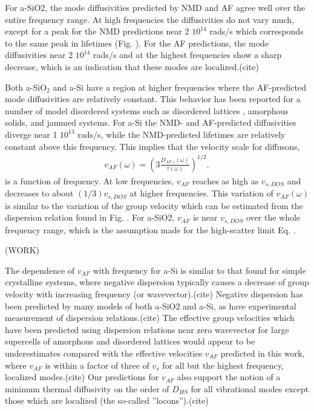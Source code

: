 \documentclass[aps,prb,onecolumn,preprint,superscriptaddress,footinbib,amsmath,amssymb,floatfix]{revtex4}
\begin{document}
For a-SiO2, the mode diffusivities predicted by NMD and AF agree 
well over the entire frequency range. At high frequencies the 
diffusivities do not vary much, except for a 
peak for the NMD predictions near 2 $10^{14}$ rads/s which 
corresponds to the same peak in lifetimes (Fig. ). For 
the AF predictions, the mode diffusivities near 
2 $10^{14}$ rads/s and at the highest frequencies 
show a sharp decrease, which is an indication 
that these modes are localized.(cite) 

Both a-SiO$_2$ and a-Si have a region at higher frequencies where the 
AF-predicted mode diffusivities are relatively constant. This behavior 
has been reported for a number of model disordered systems such as 
disordered lattices
\cite{sheng_heat_1991,beltukov_ioffe-regel_2013,larkin_predicting_2013}, 
amorphous solids,\cite{he_thermal_2011} 
and jammed systems.\cite{xu_energy_2009,vitelli_heat_2010}  
For a-Si the NMD- and AF-predicted diffusivities diverge 
near 1 $10^{13}$ rads$/$s, while the NMD-predicted lifetimes 
are relatively constant above this frequency.  This implies 
that the velocity scale for diffusons,
\begin{equation}\label{EQ:vAF}
\begin{split}
v_{AF}(\omega) = \left(3\frac{D_{AF,i}(\omega)}{\tau(\omega)}\right)^{1/2},
\end{split}
\end{equation}
is a function of frequency. At low frequencies, $v_{AF}$ 
reaches as high as $v_{s,DOS}$ and decreases to about $(1/3) v_{s,DOS}$ 
at higher frequencies. This variation of $v_{AF}(\omega)$ is similar 
to the variation of the group velocity which can be estimated from 
the dispersion relation found in Fig. . For a-SiO2, $v_{AF}$ is near 
$v_{s,DOS}$ over the whole frequency range, which is the assumption 
made for the high-scatter limit Eq. .

(WORK)

The dependence of $v_{AF}$ with frequency for a-Si is similar to 
that found for 
simple crystalline systems, where negative dispersion typically 
causes a decrease of group velocity with increasing frequency (or 
wavevector).(cite) Negative dispersion has been predicted by many 
models of both a-SiO2 and a-Si,\cite{ruocco_relaxation_2000} 
as have experimental measurement of 
dispersion relations.(cite) The effective group velocities 
which have been predicted using dispersion relations near zero 
wavevector for large supercells of amorphous\cite{he_thermal_2011,he_heat_2011} 
and disordered lattices\cite{hori_phonon_2013} would appear to 
be underestimates 
compared with the effective velocities $v_{AF}$ predicted in this work, 
where $v_{AF}$ is within a factor of three of $v_s$ for all but the 
highest frequency, localized modes.(cite) Our predictions for 
$v_{AF}$ also support the notion of a minimum thermal diffusivity 
on the order of $D_{HS}$ for all vibrational modes except   
those which are localized (the so-called ''locons'').(cite) 
\end{document}
